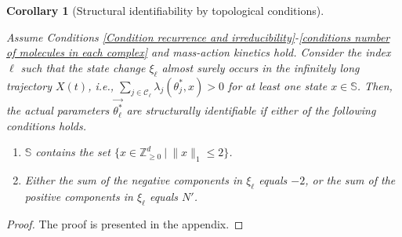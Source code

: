 \documentclass[pdflatex,sn-mathphys-num]{sn-jnl}%
\theoremstyle{thmstyleone}%
\newtheorem{corollary}[theorem]{Corollary}
\theoremstyle{thmstyletwo}%
\theoremstyle{thmstylethree}%
\begin{document}
\begin{corollary}[Structural identifiability by topological conditions] \label{corollary structural identifiability by topological conditions}

    Assume Conditions \ref{Condition recurrence and irreducibility}-\ref{conditions number of molecules in each complex} and mass-action kinetics hold. 
    Consider the index $\ell$ such that the state change $\xi_\ell$ almost surely occurs in the infinitely long trajectory $X(t)$, i.e., $\sum_{j\in\mathcal C_\ell}\lambda_{j}(\theta^*_j,x) > 0$ for at least one state $x\in \mathbb S$. 
    Then, the actual parameters  $\overrightarrow {\theta^*_\ell}$ are structurally identifiable if either of the following conditions holds.
    \begin{enumerate}
        \item[(1)] $\mathbb S$ contains the set $\{x\in \mathbb Z^d_{\geq 0} ~\big|~ \|x\|_1 \leq 2 \}$.
        
        \item[(2)] Either the sum of the negative components in $\xi_\ell$ equals $-2$, or the sum of the positive components in $\xi_\ell$ equals $N'$.
    \end{enumerate}
\end{corollary}

\begin{proof}
    The proof is presented in the appendix.
\end{proof}
\end{document}
